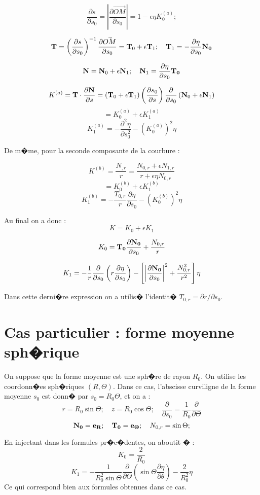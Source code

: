 \documentclass{jfm}
\newcommand\DP[2]{\frac{\partial #1}{\partial #2}}
\begin{document}
$$
\DP{s}{s_0} = \left| \DP{\vec{OM}}{s_0} \right| = 1 - \epsilon \eta K_0^{(a)} ;
$$

$$
{\bf T} = \left(\DP{s}{s_0}\right)^{-1} \DP{\vec{OM}}{s_0} = {\bf T}_0 +  \epsilon  {\bf T}_1 ; \quad 
{\bf T}_1 = - \DP{\eta}{s_0}{\bf N_0}
$$

$$
{\bf N} = {\bf N}_0 +  \epsilon  {\bf N}_1 ; \quad 
{\bf N}_1 = \DP{\eta}{s_0}{\bf T_0}
$$

$$
K^{(a)} = {\bf T} \cdot \DP{{\bf N}}{s} =  
\left( {\bf T}_0 +  \epsilon  {\bf T}_1 \right) \left( \DP{s_0}{s} \right) 
 \DP{}{s_0}  \left({\bf N}_0 +  \epsilon  {\bf N}_1 \right)
$$
$$
= K^{(a)}_0 + \epsilon K^{(a)}_1
$$
$$
K^{(a)}_1 = 
-\DP{^2 \eta }{s_0^2} - \left( K^{(a)}_0 \right)^2 \eta 
$$ 


De m�me, pour la seconde composante de la courbure : 

$$
K^{(b)} = \frac{ N_{,r}}{r} = \frac{ N_{0,r} + \epsilon N_{1,r}}{r + \epsilon \eta N_{0,r}}
$$
$$
= 
K^{(b)}_0 + \epsilon K^{(b)}_1
$$
$$
K^{(b)}_1 = - \frac{T_{0,r}}{r} \DP{\eta}{s_0} -  \left( K^{(b)}_0 \right)^2 \eta 
$$

Au final on a donc :
$$
K = K_0 + \epsilon K_1
$$

$$
K_0   = {\bf T_0} \DP{\bf N_0}{s_0}  + \frac{N_{0,r}}{r}
$$

$$
K_1   = - \frac{1}{r} \DP{}{s_0} \left( r \DP{\eta}{s_0} \right) -
\left[ \left| \DP{\bf N_0}{s_0} \right|^2  + \frac{N_{0,r}^2}{r^2} \right] \eta
$$

Dans cette derni�re expression on a utilis� l'identit� $T_{0,r} = \partial r / \partial s_0$.

\section{Cas particulier : forme moyenne sph�rique}

On suppose que la forme moyenne est une sph�re de rayon $R_0$. On utilise les coordonn�es sph�riques $(R,\Theta)$. Dans ce cas, l'abscisse curviligne de la forme moyenne $s_0$ est donn� par 
$s_0  = R_0 \Theta$, et on a :
$$
r = R_0 \sin \Theta ; \quad z = R_0 \cos \Theta; \quad \DP{}{s_0} = \frac{1}{R_0} \DP{}{\Theta}
$$
$$
{\bf N_0} = {\bf e_R} ; \quad {\bf T_0} = {\bf e_\Theta} ; \quad N_{0,r} = \sin \Theta; 
$$

En injectant dans les formules pr�c�dentes, on aboutit � :
$$
K_0 = \frac{2}{R_0}
$$
$$ 
K_1 = - \frac{1}{R_0^2 \sin \Theta} \DP{}{\Theta} \left( \sin \Theta \DP{\eta}{\theta} \right) 
- \frac{2}{R_0^2} \eta
$$
Ce qui correspond bien aux formules obtenues dans ce cas.
\end{document}
